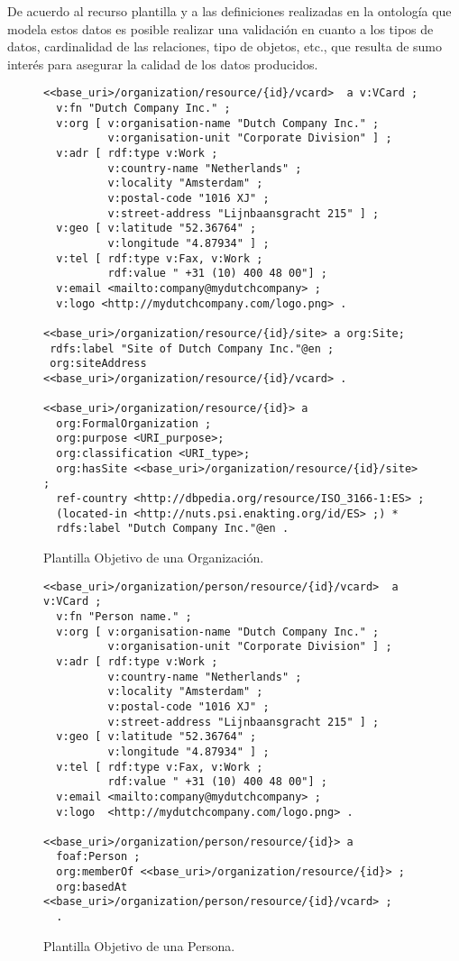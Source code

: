 De acuerdo al recurso plantilla y a las definiciones realizadas en la ontología que modela estos datos 
es posible realizar una validación en cuanto a los tipos de datos, cardinalidad de las relaciones, tipo de objetos, etc., que 
resulta de sumo interés para asegurar la calidad de los datos producidos.
\begin{figure}[!htp]
\begin{lstlisting} 
<<base_uri>/organization/resource/{id}/vcard>  a v:VCard ;
  v:fn "Dutch Company Inc." ;
  v:org [ v:organisation-name "Dutch Company Inc." ;
          v:organisation-unit "Corporate Division" ] ;
  v:adr [ rdf:type v:Work ;
          v:country-name "Netherlands" ;
          v:locality "Amsterdam" ;
          v:postal-code "1016 XJ" ;
          v:street-address "Lijnbaansgracht 215" ] ;
  v:geo [ v:latitude "52.36764" ;
          v:longitude "4.87934" ] ;
  v:tel [ rdf:type v:Fax, v:Work ;
          rdf:value " +31 (10) 400 48 00"] ; 
  v:email <mailto:company@mydutchcompany> ;
  v:logo <http://mydutchcompany.com/logo.png> .

<<base_uri>/organization/resource/{id}/site> a org:Site;
 rdfs:label "Site of Dutch Company Inc."@en ;
 org:siteAddress <<base_uri>/organization/resource/{id}/vcard> .

<<base_uri>/organization/resource/{id}> a 
  org:FormalOrganization ;   
  org:purpose <URI_purpose>;
  org:classification <URI_type>;
  org:hasSite <<base_uri>/organization/resource/{id}/site> ;
  ref-country <http://dbpedia.org/resource/ISO_3166-1:ES> ;
  (located-in <http://nuts.psi.enakting.org/id/ES> ;) *
  rdfs:label "Dutch Company Inc."@en .
\end{lstlisting}
	\caption{Plantilla Objetivo de una Organización.}
	\label{fig:orgs-template}
\end{figure}


\begin{figure}[!htp]
\begin{lstlisting} 
<<base_uri>/organization/person/resource/{id}/vcard>  a v:VCard ;
  v:fn "Person name." ;
  v:org [ v:organisation-name "Dutch Company Inc." ;
          v:organisation-unit "Corporate Division" ] ;
  v:adr [ rdf:type v:Work ;
          v:country-name "Netherlands" ;
          v:locality "Amsterdam" ;
          v:postal-code "1016 XJ" ;
          v:street-address "Lijnbaansgracht 215" ] ;
  v:geo [ v:latitude "52.36764" ;
          v:longitude "4.87934" ] ;
  v:tel [ rdf:type v:Fax, v:Work ;
          rdf:value " +31 (10) 400 48 00"] ; 
  v:email <mailto:company@mydutchcompany> ;
  v:logo  <http://mydutchcompany.com/logo.png> .

<<base_uri>/organization/person/resource/{id}> a 
  foaf:Person ;
  org:memberOf <<base_uri>/organization/resource/{id}> ;
  org:basedAt <<base_uri>/organization/person/resource/{id}/vcard> ;  
  . 
\end{lstlisting}
	\caption{Plantilla Objetivo de una Persona.}
	\label{fig:person-template}
\end{figure}


